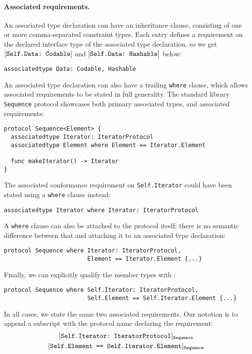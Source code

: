 \documentclass[../generics]{subfiles}
\begin{document}
\paragraph{Associated requirements.}
An associated type declaration can have an inheritance clause, consisting of one or more comma-separated constraint types. Each entry defines a requirement on the declared interface type of the associated type declaration, so we get $[\texttt{Self.Data:~Codable}]$ and $[\texttt{Self.Data:~Hashable}]$ below:
\begin{Verbatim}
associatedtype Data: Codable, Hashable
\end{Verbatim}

An associated type declaration can also have a trailing \texttt{where} clause, which allows associated requirements to be stated in full generality. The standard library \texttt{Sequence} protocol showcases both primary associated types, and associated requirements:
\begin{Verbatim}
protocol Sequence<Element> {
  associatedtype Iterator: IteratorProtocol
  associatedtype Element where Element == Iterator.Element

  func makeIterator() -> Iterator
}
\end{Verbatim}
The associated conformance requirement on \texttt{Self.Iterator} could have been stated using a \texttt{where} clause instead:
\begin{Verbatim}
associatedtype Iterator where Iterator: IteratorProtocol
\end{Verbatim}
A \texttt{where} clause can also be attached to the protocol itself; there is no semantic difference between that and attaching it to an associated type declaration:
\begin{Verbatim}
protocol Sequence where Iterator: IteratorProtocol,
                        Element == Iterator.Element {...}
\end{Verbatim}
Finally, we can explicitly qualify the member types with \tSelf:
\begin{Verbatim}
protocol Sequence where Self.Iterator: IteratorProtocol,
                        Self.Element == Self.Iterator.Element {...}
\end{Verbatim}
In all cases, we state the same two associated requirements. Our notation is to append a subscript with the protocol name declaring the requirement:
\begin{gather*}
\ConfReq{Self.Iterator}{IteratorProtocol}_\texttt{Sequence}\\
\SameReq{Self.Element}{Self.Iterator.Element}_\texttt{Sequence}
\end{gather*}
\end{document}
